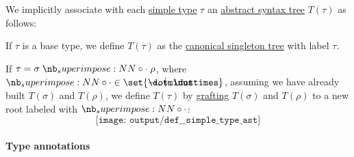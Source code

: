 \begin{definition}\label{def:simple_type_ast}\mimprovised
  We implicitly associate with each \hyperref[def:simple_type]{simple type} \( \tau \) an \hyperref[con:abstract_syntax_tree]{abstract syntax tree} \( T(\tau) \) as follows:
  \begin{thmenum}
     If \( \tau \) is a base type, we define \( T(\tau) \) as the \hyperref[def:canonical_singleton_tree]{canonical singleton tree} with label \( \tau \).

     If \( \tau = \sigma \syncirc \rho \), where \( {\syncirc} \in \set{ \synimplies, \synplus, \syntimes } \), assuming we have already built \( T(\sigma) \) and \( T(\rho) \), we define \( T(\tau) \) by \hyperref[def:ordered_tree_grafting_product]{grafting} \( T(\sigma) \) and \( T(\rho) \) to a new root labeled with \( \syncirc \):
    \begin{equation*}
      \texttt{[image: output/def\_\_simple\_type\_ast]}
    \end{equation*}
  \end{thmenum}
\end{definition}

\paragraph{Type annotations}

